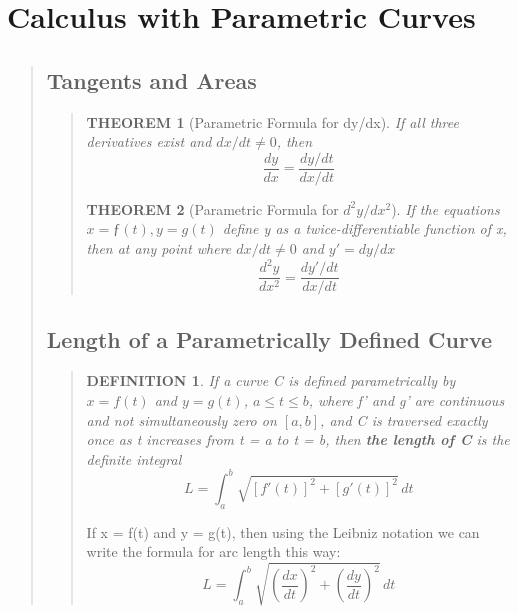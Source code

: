 \documentclass{report}
\newtheorem{theorem}{THEOREM}
\newtheorem*{definition}{DEFINITION}
\begin{document}
\section{Calculus with Parametric Curves }
\begin{quote}

	\subsection{Tangents and Areas}
	\begin{quote}

		\begin{theorem}[Parametric Formula for dy/dx]
			\mbox{}\par
			If all three derivatives exist and $dx/dt \neq 0$, then
			$$\frac{dy}{dx}=\frac{dy/dt}{dx/dt}$$
		\end{theorem}
		
		\begin{theorem}[Parametric Formula for $d^2y/dx^2$]
			\mbox{}\par
			If the equations $x = ƒ(t), y = g(t)$ define y as a twice-differentiable function of x, then at any point where $dx/dt \neq 0$ and $y' = dy/dx$
			$$\frac{d^2y}{dx^2}= \frac{dy'/dt}{dx/dt}$$
		\end{theorem}
		
	\end{quote}

	\subsection{Length of a Parametrically Defined Curve}
	\begin{quote}
		\begin{definition}
			If a curve C is defined parametrically by $x = f(t)$ and $y = g(t)$, $a\leq t\leq b$, where f' and g' are continuous and not simultaneously zero on $\left [a,b\right ]$, and C is traversed exactly once as t increases from t = a to t = b, then \textbf{the length of C} is the definite integral
			$$L = \int_a^b \sqrt{[f'(t)]^2+[g'(t)]^2} \,dt$$
		\end{definition}

		\begin{info}
			If x = ƒ(t) and y = g(t), then using the Leibniz notation we can write the formula for arc length this way:
			$$L = \int_a^b \sqrt{\left (\frac{dx}{dt}\right )^2+\left (\frac{dy}{dt}\right )^2}\,dt$$
		\end{info}

	\end{quote}


\end{quote}
\end{document}
